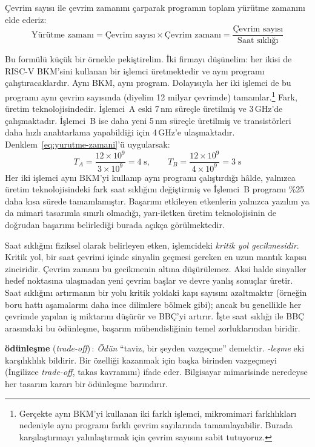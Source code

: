 Çevrim sayısı ile çevrim zamanını çarparak programın toplam yürütme zamanını elde ederiz:
\begin{equation}
\text{Yürütme zamanı} = \text{Çevrim sayısı} \times \text{Çevrim zamanı} = \frac{\text{Çevrim sayısı}}{\text{Saat sıklığı}}
\label{eq:yurutme-zamani}
\end{equation}

Bu formülü küçük bir örnekle pekiştirelim. İki firmayı düşünelim: her ikisi de RISC-V BKM'sini kullanan bir işlemci üretmektedir ve aynı programı çalıştıracaklardır. Aynı BKM, aynı program. Dolayısıyla her iki işlemci de bu programı aynı çevrim sayısında (diyelim 12 milyar çevrimde) tamamlar.\footnote{Gerçekte aynı BKM'yi kullanan iki farklı işlemci, mikromimari farklılıkları nedeniyle aynı programı farklı çevrim sayılarında tamamlayabilir. Burada karşılaştırmayı yalınlaştırmak için çevrim sayısını sabit tutuyoruz.} Fark, üretim teknolojisindedir. İşlemci~A eski 7\,nm süreçle üretilmiş ve 3\,GHz'de çalışmaktadır. İşlemci~B ise daha yeni 5\,nm süreçle üretilmiş ve transistörleri daha hızlı anahtarlama yapabildiği için 4\,GHz'e ulaşmaktadır. Denklem~\ref{eq:yurutme-zamani}'ü uygularsak:
%
\[
T_A = \frac{12 \times 10^9}{3 \times 10^9} = 4\;\text{s}, \qquad
T_B = \frac{12 \times 10^9}{4 \times 10^9} = 3\;\text{s}
\]
%
Her iki işlemci aynı BKM'yi kullanıp aynı programı çalıştırdığı hâlde, yalnızca üretim teknolojisindeki fark saat sıklığını değiştirmiş ve İşlemci~B programı \%25 daha kısa sürede tamamlamıştır. Başarımı etkileyen etkenlerin yalnızca yazılım ya da mimari tasarımla sınırlı olmadığı, yarı-iletken üretim teknolojisinin de doğrudan başarımı belirlediği burada açıkça görülmektedir.

Saat sıklığını fiziksel olarak belirleyen etken, işlemcideki \emph{kritik yol gecikmesidir}. Kritik yol, bir saat çevrimi içinde sinyalin geçmesi gereken en uzun mantık kapısı zinciridir. Çevrim zamanı bu gecikmenin altına düşürülemez. Aksi halde sinyaller hedef noktasına ulaşmadan yeni çevrim başlar ve devre yanlış sonuçlar üretir. Saat sıklığını artırmanın bir yolu kritik yoldaki kapı sayısını azaltmaktır (örneğin boru hattı aşamalarını daha ince dilimlere bölmek gibi); ancak bu genellikle her çevrimde yapılan iş miktarını düşürür ve BBÇ'yi artırır. İşte saat sıklığı ile BBÇ arasındaki bu ödünleşme, başarım mühendisliğinin temel zorluklarından biridir.

\begin{terimnotu}
\textbf{ödünleşme} (\emph{trade-off})\,: \emph{Ödün} ``taviz, bir şeyden vazgeçme'' demektir. \emph{-leşme} eki karşılıklılık bildirir. Bir özelliği kazanmak için başka birinden vazgeçmeyi (İngilizce \emph{trade-off}, takas kavramını) ifade eder. Bilgisayar mimarisinde neredeyse her tasarım kararı bir ödünleşme barındırır.
\end{terimnotu}

